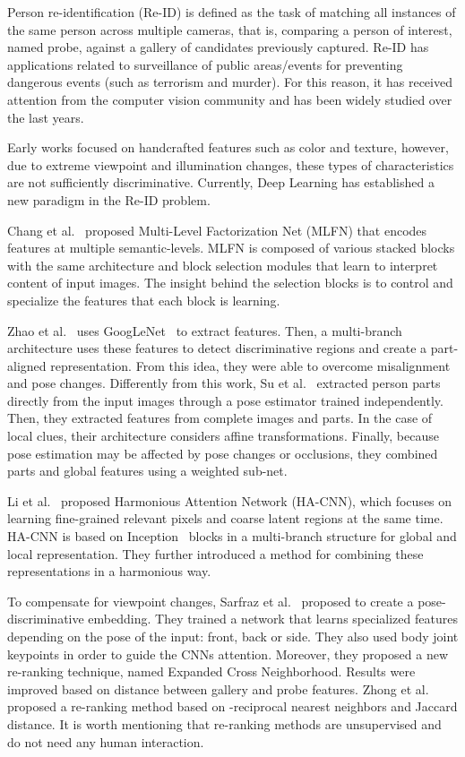 \documentclass[final,3p,times,twocolumn]{elsarticle}
\begin{document}
Person re-identification (Re-ID) is defined as the task of matching all instances of the same person across multiple cameras, that is, comparing a person of interest, named probe, against a gallery of candidates previously captured. Re-ID has applications related to surveillance of public areas/events for preventing dangerous events (such as terrorism and murder). For this reason, it has received attention from the computer vision community and has been widely studied over the last years.

Early works focused on handcrafted features such as color and texture, however, due to extreme viewpoint and illumination changes, these types of characteristics are not sufficiently discriminative. Currently, Deep Learning has established a new paradigm in the Re-ID problem.

Chang et al.~\cite{chang2018multi} proposed Multi-Level Factorization Net (MLFN) that encodes features at multiple semantic-levels. MLFN is composed of various stacked blocks with the same architecture and block selection modules that learn to interpret content of input images. The insight behind the selection blocks is to control and specialize the features that each block is learning.

Zhao et al.~\cite{zhao2017deeply} uses GoogLeNet~\cite{szegedy2015going} to extract features. Then, a multi-branch architecture uses these features to detect discriminative regions and create a part-aligned representation. From this idea, they were able to overcome misalignment and pose changes. Differently from this work, Su et al.~\cite{su2017pose} extracted person parts directly from the input images through a pose estimator trained independently. Then, they extracted features from complete images and parts. In the case of local clues, their architecture considers affine transformations. Finally, because pose estimation may be affected by pose changes or occlusions, they combined parts and global features using a weighted sub-net.

Li et al.~\cite{li2018harmonious} proposed Harmonious Attention Network (HA-CNN), which focuses on learning fine-grained relevant pixels and coarse latent regions at the same time. HA-CNN is based on Inception~\cite{szegedy2015going} blocks in a multi-branch structure for global and local representation. They further introduced a method for combining these representations in a harmonious way.

To compensate for viewpoint changes, Sarfraz et al.~\cite{sarfraz2018pose} proposed to create a pose-discriminative embedding. They trained a network that learns specialized features depending on the pose of the input: front, back or side. They also used body joint keypoints in order to guide the CNNs attention. Moreover, they proposed a new re-ranking technique, named Expanded Cross Neighborhood. Results were improved based on distance between gallery and probe features. Zhong et al.~\cite{zhong2017re} proposed a re-ranking method based on -reciprocal nearest neighbors and Jaccard distance. It is worth mentioning that re-ranking methods are unsupervised and do not need any human interaction.
\end{document}
